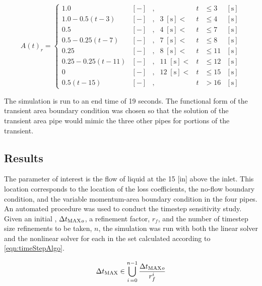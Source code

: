 \begin{equation}
\label{eqn:valveTransLoss}
A(t)_{r} = \left\{
\begin{array}{cclrcll}
 1.0 & [-] & , & & t & \leq 3 & [\text{s}] \\
 1.0 - 0.5 \left( t - 3\right) & [-] & , & 3\; [\text{s}] < & t & \leq 4 & [\text{s}] \\
 0.5 & [-] & , & 4\; [\text{s}] < & t & \leq 7 & [\text{s}] \\
 0.5 - 0.25 \left( t - 7\right) & [-] & , &  7\; [\text{s}] < & t & \leq 8 & [\text{s}] \\
 0.25 & [-] & , & 8\; [\text{s}] < & t & \leq 11 & [\text{s}] \\
 0.25 - 0.25 \left( t - 11\right) & [-] & , & 11\; [\text{s}] < & t & \leq 12 & [\text{s}] \\
 0 & [-] & , & 12\; [\text{s}] < & t & \leq 15 & [\text{s}] \\
 0.5 \left( t - 15\right) & [-] & , & & t & > 16 & [\text{s}]
\end{array}\right.
\end{equation}

The simulation is run to an end time of 19 seconds.
The functional form of the transient area boundary condition was chosen so that the solution of the transient area pipe would mimic the three other pipes for portions of the transient.

\subsection{Results}
\label{subsect:valveResults}

The parameter of interest is the flow of liquid at the 15 [in] above the inlet.
This location corresponds to the location of the loss coefficients, the no-flow boundary condition, and the variable momentum-area boundary condition in the four pipes.
An automated procedure was used to conduct the timestep sensitivity study.
Given an initial \dtmax{}, $\dtmax{}_{o}$, a refinement factor, $r_{f}$, and the number of timestep size refinements to be taken, $n$, the simulation was run with both the linear solver and the nonlinear solver for each \dtmax{} in the set calculated according to \eqref{eqn:timeStepAlgo}.

\begin{equation}
\label{eqn:timeStepAlgo}
\dtmax{} \in \bigcup^{n-1}_{i\, = 0} \frac{\dtmax{}_{o}}{r^{i}_{f}}
\end{equation}

